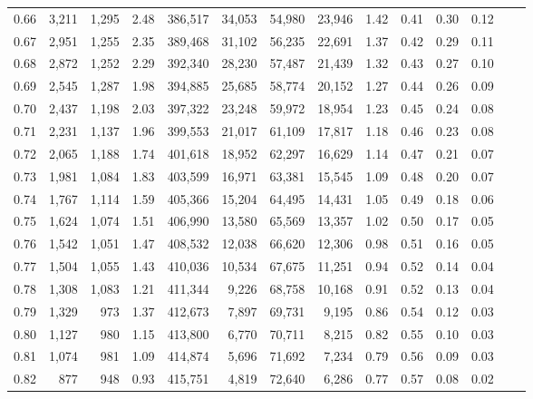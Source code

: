 \begin{tabular}{rrrrrrrrrrrrrr}
0.66 &  3,211 &  1,295 &    2.48 &  386,517 &   34,053 &  54,980 &  23,946 &  1.42 &  0.41 &  0.30 &      0.12 \\
0.67 &  2,951 &  1,255 &    2.35 &  389,468 &   31,102 &  56,235 &  22,691 &  1.37 &  0.42 &  0.29 &      0.11 \\
0.68 &  2,872 &  1,252 &    2.29 &  392,340 &   28,230 &  57,487 &  21,439 &  1.32 &  0.43 &  0.27 &      0.10 \\
0.69 &  2,545 &  1,287 &    1.98 &  394,885 &   25,685 &  58,774 &  20,152 &  1.27 &  0.44 &  0.26 &      0.09 \\
0.70 &  2,437 &  1,198 &    2.03 &  397,322 &   23,248 &  59,972 &  18,954 &  1.23 &  0.45 &  0.24 &      0.08 \\
0.71 &  2,231 &  1,137 &    1.96 &  399,553 &   21,017 &  61,109 &  17,817 &  1.18 &  0.46 &  0.23 &      0.08 \\
0.72 &  2,065 &  1,188 &    1.74 &  401,618 &   18,952 &  62,297 &  16,629 &  1.14 &  0.47 &  0.21 &      0.07 \\
0.73 &  1,981 &  1,084 &    1.83 &  403,599 &   16,971 &  63,381 &  15,545 &  1.09 &  0.48 &  0.20 &      0.07 \\
0.74 &  1,767 &  1,114 &    1.59 &  405,366 &   15,204 &  64,495 &  14,431 &  1.05 &  0.49 &  0.18 &      0.06 \\
0.75 &  1,624 &  1,074 &    1.51 &  406,990 &   13,580 &  65,569 &  13,357 &  1.02 &  0.50 &  0.17 &      0.05 \\
0.76 &  1,542 &  1,051 &    1.47 &  408,532 &   12,038 &  66,620 &  12,306 &  0.98 &  0.51 &  0.16 &      0.05 \\
0.77 &  1,504 &  1,055 &    1.43 &  410,036 &   10,534 &  67,675 &  11,251 &  0.94 &  0.52 &  0.14 &      0.04 \\
0.78 &  1,308 &  1,083 &    1.21 &  411,344 &    9,226 &  68,758 &  10,168 &  0.91 &  0.52 &  0.13 &      0.04 \\
0.79 &  1,329 &    973 &    1.37 &  412,673 &    7,897 &  69,731 &   9,195 &  0.86 &  0.54 &  0.12 &      0.03 \\
0.80 &  1,127 &    980 &    1.15 &  413,800 &    6,770 &  70,711 &   8,215 &  0.82 &  0.55 &  0.10 &      0.03 \\
0.81 &  1,074 &    981 &    1.09 &  414,874 &    5,696 &  71,692 &   7,234 &  0.79 &  0.56 &  0.09 &      0.03 \\
0.82 &    877 &    948 &    0.93 &  415,751 &    4,819 &  72,640 &   6,286 &  0.77 &  0.57 &  0.08 &      0.02 \\

\end{tabular}
